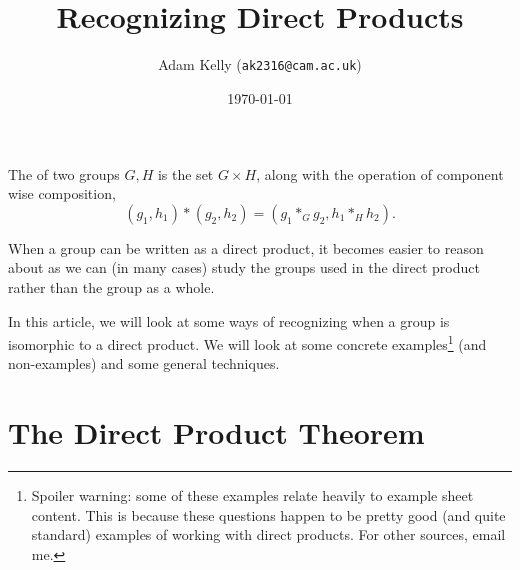 \documentclass[11pt]{article}
\title{\vspace{-3\baselineskip}\ \\Recognizing Direct Products}
\author{Adam Kelly (\texttt{ak2316@cam.ac.uk})}
\date{\today}
\begin{document}
\maketitle

The  of two groups $G, H$ is the set $G \times H$, along with the operation of component wise composition,
$$
(g_1, h_1) * (g_2, h_2) = (g_1 *_G g_2, h_1 *_H h_2).
$$

When a group can be written as a direct product, it becomes easier to reason about as we can (in many cases) study the groups used in the direct product rather than the group as a whole.

In this article, we will look at some ways of recognizing when a group is isomorphic to a direct product. We will look at some concrete examples\footnote{Spoiler warning: some of these examples relate heavily to example sheet content. This is because these questions happen to be pretty good (and quite standard) examples of working with direct products. For other sources, email me.} (and non-examples) and some general techniques.




\section{The Direct Product Theorem}

\end{document}
